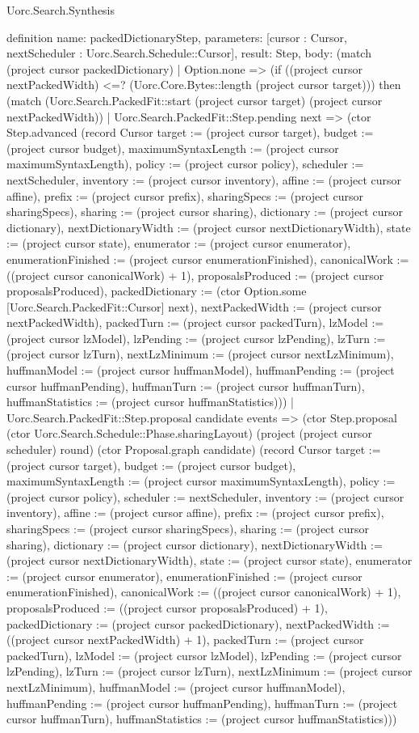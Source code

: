 \begin{lexlean}{Uorc.Search.Synthesis}
\begin{semanticmodule}
definition{
  name: packedDictionaryStep,
  parameters: [cursor : Cursor, nextScheduler : Uorc.Search.Schedule::Cursor],
  result: Step,
  body: (match (project cursor packedDictionary)
    | Option.none => (if ((project cursor nextPackedWidth) <=? (Uorc.Core.Bytes::length (project cursor target))) then (match (Uorc.Search.PackedFit::start (project cursor target) (project cursor nextPackedWidth))
      | Uorc.Search.PackedFit::Step.pending next => (ctor Step.advanced (record Cursor {target := (project cursor target), budget := (project cursor budget), maximumSyntaxLength := (project cursor maximumSyntaxLength), policy := (project cursor policy), scheduler := nextScheduler, inventory := (project cursor inventory), affine := (project cursor affine), prefix := (project cursor prefix), sharingSpecs := (project cursor sharingSpecs), sharing := (project cursor sharing), dictionary := (project cursor dictionary), nextDictionaryWidth := (project cursor nextDictionaryWidth), state := (project cursor state), enumerator := (project cursor enumerator), enumerationFinished := (project cursor enumerationFinished), canonicalWork := ((project cursor canonicalWork) + 1), proposalsProduced := (project cursor proposalsProduced), packedDictionary := (ctor Option.some [Uorc.Search.PackedFit::Cursor] next), nextPackedWidth := (project cursor nextPackedWidth), packedTurn := (project cursor packedTurn), lzModel := (project cursor lzModel), lzPending := (project cursor lzPending), lzTurn := (project cursor lzTurn), nextLzMinimum := (project cursor nextLzMinimum), huffmanModel := (project cursor huffmanModel), huffmanPending := (project cursor huffmanPending), huffmanTurn := (project cursor huffmanTurn), huffmanStatistics := (project cursor huffmanStatistics)}))
      | Uorc.Search.PackedFit::Step.proposal candidate events => (ctor Step.proposal (ctor Uorc.Search.Schedule::Phase.sharingLayout) (project (project cursor scheduler) round) (ctor Proposal.graph candidate) (record Cursor {target := (project cursor target), budget := (project cursor budget), maximumSyntaxLength := (project cursor maximumSyntaxLength), policy := (project cursor policy), scheduler := nextScheduler, inventory := (project cursor inventory), affine := (project cursor affine), prefix := (project cursor prefix), sharingSpecs := (project cursor sharingSpecs), sharing := (project cursor sharing), dictionary := (project cursor dictionary), nextDictionaryWidth := (project cursor nextDictionaryWidth), state := (project cursor state), enumerator := (project cursor enumerator), enumerationFinished := (project cursor enumerationFinished), canonicalWork := ((project cursor canonicalWork) + 1), proposalsProduced := ((project cursor proposalsProduced) + 1), packedDictionary := (project cursor packedDictionary), nextPackedWidth := ((project cursor nextPackedWidth) + 1), packedTurn := (project cursor packedTurn), lzModel := (project cursor lzModel), lzPending := (project cursor lzPending), lzTurn := (project cursor lzTurn), nextLzMinimum := (project cursor nextLzMinimum), huffmanModel := (project cursor huffmanModel), huffmanPending := (project cursor huffmanPending), huffmanTurn := (project cursor huffmanTurn), huffmanStatistics := (project cursor huffmanStatistics)}))
}
\end{semanticmodule}
\end{lexlean}
